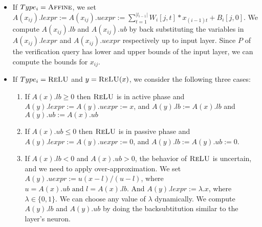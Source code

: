 \begin{itemize}
\item If $Type_i= \textsc{Affine}$, we set 
  $A(x_{ij}).lexpr := A(x_{ij}).uexpr := \sum_{t=1}^{|l_{i-1}|} W_i[j,t]*x_{(i-1)t} + B_i[j,0]$.
  We compute $A(x_{ij}).lb$ and $A(x_{ij}).ub$ by back substituting
  the variables in $A(x_{ij}).lexpr$ and $A(x_{ij}).uexpr$ respectively up to input layer.
  Since $P$ of the verification query has lower and upper bounds of the input layer,
  we can compute the bounds for $x_{ij}$.

\item If $Type_i= \textsc{ReLU}$ and $y=\textsc{ReLU}(x)$, we consider the following three cases:
  \begin{enumerate}
  \item If $A(x).lb \geq 0$ then $\textsc{ReLU}$ is in active phase and
    $A(y).lexpr := A(y).uexpr := x$,
    and $A(y).lb := A(x).lb$ and $A(y).ub := A(x).ub$
  \item If $A(x).ub \leq 0$ then $\textsc{ReLU}$ is in passive phase and
    $A(y).lexpr := A(y).uexpr := 0$, 
    and $A(y).lb := A(y).ub := 0$.
  \item  If $A(x).lb < 0$ and $A(x).ub > 0$,
    the behavior of $\textsc{ReLU}$ is uncertain, and we need to apply
    over-approximation. We set $A(y).uexpr := u(x - l) / (u - l)$, 
    where $u = A(x).ub \text{ and } l = A(x).lb$.
    And $A(y).lexpr := \lambda . x$, where $\lambda \in \{0,1\}$. 
    We can choose any value of $\lambda$ dynamically.
    We compute $A(y).lb$ and $A(y).ub$ by doing the backsubtitution similar to the \affine{} layer's neuron.
  \end{enumerate} 



\end{itemize}


